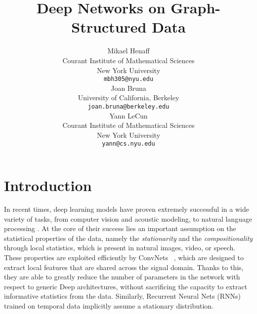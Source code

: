 \documentclass{article} %
\title{Deep Networks on Graph-Structured Data}
\author{
Mikael Henaff \\
Courant Institute of Mathematical Sciences\\
New York University\\
\texttt{mbh305@nyu.edu} \\
\And
Joan Bruna \\
University of California, Berkeley \\
\texttt{joan.bruna@berkeley.edu} \\
\AND
Yann LeCun \\
Courant Institute of Mathematical Sciences \\
New York University \\
\texttt{yann@cs.nyu.edu} \\
}
\begin{document}
\maketitle

\begin{abstract}

\end{abstract}

\section{Introduction}


In recent times, deep learning models have proven extremely successful in a wide variety of tasks, from computer vision and acoustic modeling, to natural language processing \cite{natureyann}. At the core of their success lies an important assumption on the statistical properties of the data, namely the \emph{stationarity} and the \emph{compositionality} through local statistics, which is present in natural images, video, or speech.
 These properties are exploited efficiently by ConvNets ~\cite{krizhevsky2012,hinton12}, which are designed to extract local features that are shared across the signal domain. Thanks to this, they are able to greatly reduce the number of parameters in the network with respect to generic Deep architectures, without sacrificing the capacity to extract informative statistics from the data. Similarly, Recurrent Neural Nets (RNNs) trained on temporal data implicitly assume a stationary distribution.
\end{document}
